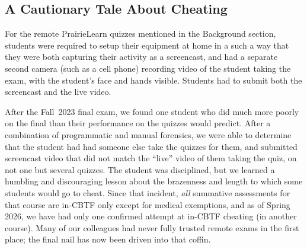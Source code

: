 \subsection{A Cautionary Tale About Cheating}
\label{sec:cheating}

For the remote PrairieLearn quizzes mentioned in the Background section,
students were required to setup
their equipment at home in a such a way that they were both capturing their
activity as a screencast, and had a separate second camera (such as a
cell phone) recording video of the student taking the exam, with 
the student's face and hands visible. Students had to submit both the
screencast and the live video.

After the Fall~2023 final exam, we found one student who did much more
poorly on the final than their performance on the quizzes would
predict.  After a combination of programmatic and manual forensics, we
were able to determine that the student had had someone else take the
quizzes for them, and submitted screencast video that did not match
the ``live'' video of them taking the quiz, on not one but several
quizzes.  The student was disciplined, but we learned a humbling and
discouraging lesson about the brazenness and length to which some students
would go to cheat.  Since that incident, \emph{all\/} summative
assessments for that course are in-CBTF only except for medical
exemptions, and as of Spring 2026, we have had only one confirmed
attempt at in-CBTF cheating (in another course).  Many of our
colleagues had never fully trusted remote exams in the first place;
the final nail has now been driven into that coffin.


